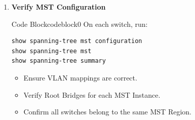 \documentclass[a4paper]{book}
\begin{document}
\begin{enumerate}
\begin{ocg}{Code Block}{codeblock}{0}
    \vspace{0.5cm}
    \begin{lstlisting}
show spanning-tree mst
\end{lstlisting}
\end{ocg}


\begin{itemize}
    \item SW1 should be the Root for MST Instance 1.
    \item SW2 should be the Root for MST Instance 2.
    \item SW3 should be the Root for MST Instance 3.
\end{itemize}




	\item \textbf{Verify MST Configuration}
	


\begin{ocg}{Code Block}{codeblock}{0}
    \vspace{0.5cm}
    On each switch, run:
    \begin{lstlisting}
show spanning-tree mst configuration
show spanning-tree mst
show spanning-tree summary
\end{lstlisting}
\end{ocg}

\begin{itemize}
    \item Ensure VLAN mappings are correct.
    \item Verify Root Bridges for each MST Instance.
    \item Confirm all switches belong to the same MST Region.
\end{itemize}


\end{enumerate}
\end{document}
